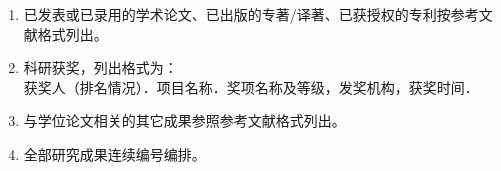 \documentclass[
    doctor,
    pdflinks,
    ]{xjtuthesis}
\begin{document}
    

    \xjtuchead
    \xjtuehead
    \xjtucinfopage
    \xjtueinfopage
    \xjtutoc
    \xjtutoe
    \clearpage

    

    \xjtucontent

        

        

        

        

        

        

    \xjtuendcontent


    \xjtuappendix

        

    \xjtuendappendix


        


        \begin{enumerate}
            \item 已发表或已录用的学术论文、已出版的专著/译著、已获授权的专利按参考文献格式列出。
            \item 科研获奖，列出格式为：\\
                获奖人（排名情况）．项目名称．奖项名称及等级，发奖机构，获奖时间．
            \item 与学位论文相关的其它成果参照参考文献格式列出。
            \item 全部研究成果连续编号编排。
        \end{enumerate}

    \xjtuacademicintegrity
\end{document}
